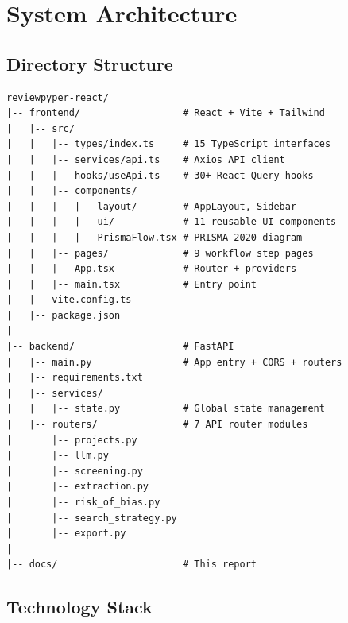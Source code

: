 \documentclass[11pt,a4paper]{article}
\begin{document}
\section{System Architecture}

\subsection{Directory Structure}

\begin{lstlisting}[style=python, title=Project Layout]
reviewpyper-react/
|-- frontend/                  # React + Vite + Tailwind
|   |-- src/
|   |   |-- types/index.ts     # 15 TypeScript interfaces
|   |   |-- services/api.ts    # Axios API client
|   |   |-- hooks/useApi.ts    # 30+ React Query hooks
|   |   |-- components/
|   |   |   |-- layout/        # AppLayout, Sidebar
|   |   |   |-- ui/            # 11 reusable UI components
|   |   |   |-- PrismaFlow.tsx # PRISMA 2020 diagram
|   |   |-- pages/             # 9 workflow step pages
|   |   |-- App.tsx            # Router + providers
|   |   |-- main.tsx           # Entry point
|   |-- vite.config.ts
|   |-- package.json
|
|-- backend/                   # FastAPI
|   |-- main.py                # App entry + CORS + routers
|   |-- requirements.txt
|   |-- services/
|   |   |-- state.py           # Global state management
|   |-- routers/               # 7 API router modules
|       |-- projects.py
|       |-- llm.py
|       |-- screening.py
|       |-- extraction.py
|       |-- risk_of_bias.py
|       |-- search_strategy.py
|       |-- export.py
|
|-- docs/                      # This report
\end{lstlisting}

\subsection{Technology Stack}
\end{document}
